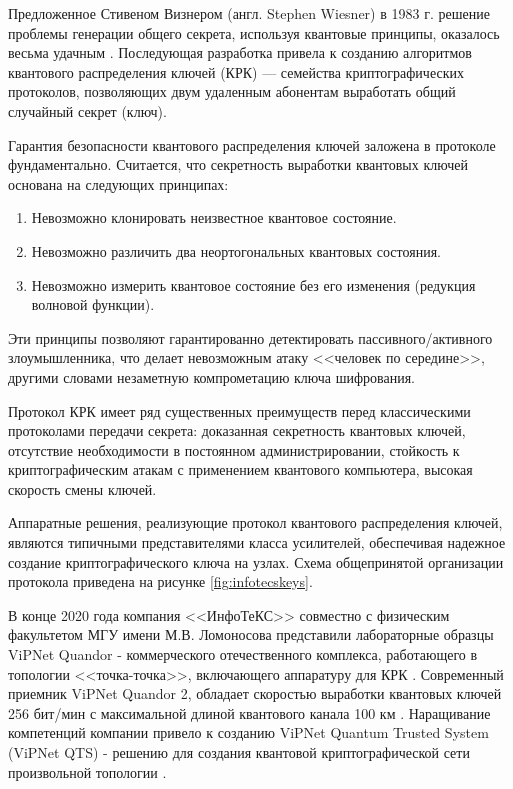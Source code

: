 \documentclass[a4paper,12pt]{article}
\begin{document}
Предложенное Стивеном Визнером (англ. Stephen Wiesner) в 1983 г. решение проблемы генерации общего секрета, используя квантовые принципы, оказалось весьма удачным \cite{Stephen_Wiesner}. Последующая разработка привела к созданию алгоритмов квантового распределения ключей (КРК) — семейства криптографических протоколов, позволяющих двум удаленным абонентам выработать общий случайный секрет (ключ). 

Гарантия безопасности квантового распределения ключей заложена в протоколе фундаментально. Считается, что секретность выработки квантовых ключей основана на следующих принципах:

\begin{enumerate}
	\item Невозможно клонировать неизвестное квантовое состояние.
	\item Невозможно различить два неортогональных квантовых состояния.
	\item Невозможно измерить квантовое состояние без его изменения (редукция волновой функции).
\end{enumerate}

Эти принципы позволяют гарантированно детектировать пассивного/активного злоумышленника, что делает невозможным атаку <<человек по середине>>, другими словами незаметную компрометацию ключа шифрования.

Протокол КРК имеет ряд существенных преимуществ перед классическими протоколами передачи секрета: доказанная секретность квантовых ключей, отсутствие необходимости в постоянном администрировании, стойкость к криптографическим атакам с применением квантового компьютера, высокая скорость смены ключей.

Аппаратные решения, реализующие протокол квантового распределения ключей, являются типичными представителями класса усилителей, обеспечивая надежное создание криптографического ключа на узлах. Схема общепринятой организации протокола приведена на рисунке \ref{fig:infotecskeys}. 


В конце 2020 года компания <<ИнфоТеКС>> совместно с физическим факультетом МГУ имени М.В. Ломоносова представили лабораторные образцы ViPNet Quandor - коммерческого отечественного комплекса, работающего в топологии <<точка-точка>>, включающего аппаратуру для КРК \cite{Infotect_ViPNet1_MSU}. Современный приемник ViPNet Quandor 2, обладает скоростью выработки квантовых ключей 256 бит/мин с максимальной длиной квантового канала 100 км \cite{Infotect_ViPNet2}. Наращивание компетенций компании привело к созданию ViPNet Quantum Trusted System (ViPNet QTS) - решению для создания квантовой криптографической сети произвольной топологии \cite{Infotect_QTS}.
\end{document}
